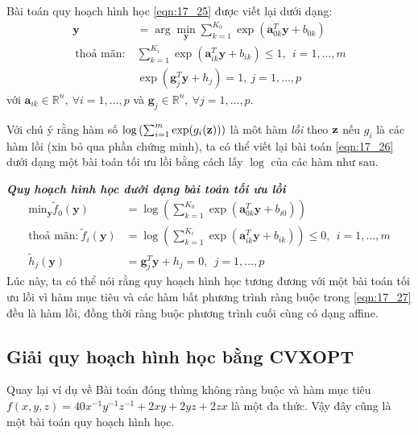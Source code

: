 Bài toán quy hoạch hình học \eqref{eqn:17_25} được viết lại dưới dạng:
\begin{equation}
\label{eqn:17_26}
\begin{aligned}
\mathbf{y} &= \arg\min_{\mathbf{y}} \sum_{k=1}^{K_0}
\exp(\mathbf{a}_{0k}^T\mathbf{y} + b_{0k})                      \\\
\text{thoả mãn:}~ & \sum_{k=1}^{K_i} \exp(\mathbf{a}_{ik}^T\mathbf{y} + b_{ik}) \leq 1, ~~i = 1, \dots, m\\\
& \exp(\mathbf{g}_j^T\mathbf{y} + h_j) = 1, ~ j= 1, \dots, p
\end{aligned}
\end{equation}
với $\mathbf{a}_{ik} \in \mathbb{R}^n,~\forall i = 1, \dots, p$ và $\mathbf{g}_j
\in
\mathbb{R}^n,~\forall j = 1, \dots, p$.

Với chú ý rằng hàm số $\log \left(\sum_{i=1}^m
\exp(g_i(\mathbf{\mathbf{z}}))\right)$ là môt hàm \textit{lồi} theo $\mathbf{z}$ nếu $g_i$ là
các hàm {lồi} (xin bỏ qua phần chứng minh), ta có thể viết lại bài
toán \eqref{eqn:17_26} dưới dạng một bài toán tối ưu lồi bằng cách lấy $\log$ của các hàm như sau.

\textbf{\textit{{Quy hoạch hình học dưới dạng bài toán tối ưu lồi}}}
\begin{equation}
\label{eqn:17_27}
\begin{aligned}
\text{min}_{\mathbf{y}} \tilde{f}_0(\mathbf{y}) &= \log\left(\sum_{k=1}^{K_0} \exp(\mathbf{a}_{0k}^T \mathbf{y} + b_{i0})\right) \\
\text{thoả mãn:}~ \tilde{f}_i(\mathbf{y}) &= \log \left(\sum_{k=1}^{K_i} \exp(\mathbf{a}_{ik}^T \mathbf{y} + b_{ik})\right) \leq 0, ~~ i = 1, \dots, m \\
\tilde{h}_j(\mathbf{y}) &= \mathbf{g}_j^T\mathbf{y} + h_j = 0,~~ j = 1, \dots, p
\end{aligned}
\end{equation}
Lúc này, ta có thể nói rằng quy hoạch hình học tương đương với một bài toán tối ưu lồi vì hàm
mục tiêu và các hàm bất phương trình ràng buộc trong \eqref{eqn:17_27} đều là hàm
lồi, đồng thời ràng buộc phương trình cuối cùng có dạng {affine}.


\subsection{Giải quy hoạch hình học bằng CVXOPT}
Quay lại ví dụ về Bài toán đóng thùng {không ràng buộc} và hàm mục
tiêu $f(x, y, z) = 40x^{-1}y^{-1}z^{-1} + 2xy + 2yz + 2zx$ là một đa thức.
Vậy đây cũng là một bài toán quy hoạch hình học.

